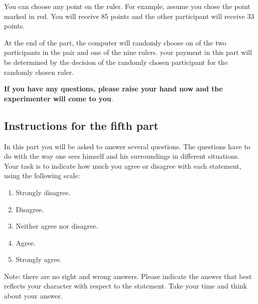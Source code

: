 You can choose any point on the ruler. For example, assume you chose the point marked in red. You will receive 85 points and the other participant will receive 33 points.

At the end of the part, the computer will randomly choose on of the two participants in the pair and one of the nine rulers. your payment in this part will be determined by the decision of the randomly chosen participant for the randomly chosen ruler.

\textbf{If you have any questions, please raise your hand now and the experimenter will come to you}.

\newpage

\subsection*{Instructions for the fifth part}

In this part you will be asked to answer several questions. The questions have to do with the way one sees himself and his surroundings in different situations. Your task is to indicate how much you agree or disagree with each statement, using the following scale:
\begin{enumerate}
	\item Strongly disagree.
	\item Disagree.
	\item Neither agree nor disagree.
	\item Agree.
	\item Strongly agree.
\end{enumerate}

Note: there are no right and wrong answers. Please indicate the answer that best reflects your character with respect to the statement. Take your time and think about your answer.


% 